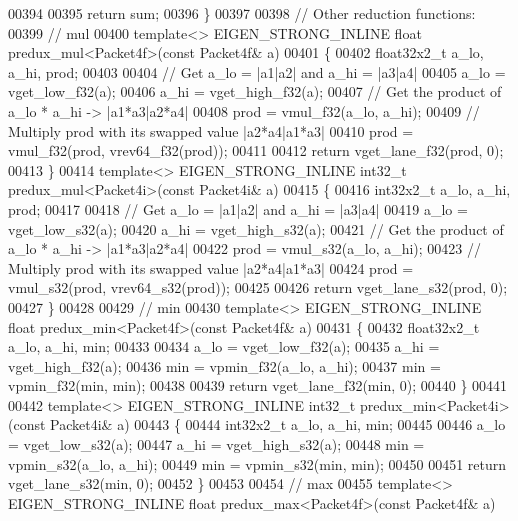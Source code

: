 \begin{DoxyCode}
{{00394 
00395   \textcolor{keywordflow}{return} sum;
00396 \}
00397 
00398 \textcolor{comment}{// Other reduction functions:}
00399 \textcolor{comment}{// mul}
00400 \textcolor{keyword}{template}<> EIGEN\_STRONG\_INLINE \textcolor{keywordtype}{float} predux\_mul<Packet4f>(\textcolor{keyword}{const} Packet4f& a)
00401 \{
00402   float32x2\_t a\_lo, a\_hi, prod;
00403 
00404   \textcolor{comment}{// Get a\_lo = |a1|a2| and a\_hi = |a3|a4|}
00405   a\_lo = vget\_low\_f32(a);
00406   a\_hi = vget\_high\_f32(a);
00407   \textcolor{comment}{// Get the product of a\_lo * a\_hi -> |a1*a3|a2*a4|}
00408   prod = vmul\_f32(a\_lo, a\_hi);
00409   \textcolor{comment}{// Multiply prod with its swapped value |a2*a4|a1*a3|}
00410   prod = vmul\_f32(prod, vrev64\_f32(prod));
00411 
00412   \textcolor{keywordflow}{return} vget\_lane\_f32(prod, 0);
00413 \}
00414 \textcolor{keyword}{template}<> EIGEN\_STRONG\_INLINE int32\_t predux\_mul<Packet4i>(\textcolor{keyword}{const} Packet4i& a)
00415 \{
00416   int32x2\_t a\_lo, a\_hi, prod;
00417 
00418   \textcolor{comment}{// Get a\_lo = |a1|a2| and a\_hi = |a3|a4|}
00419   a\_lo = vget\_low\_s32(a);
00420   a\_hi = vget\_high\_s32(a);
00421   \textcolor{comment}{// Get the product of a\_lo * a\_hi -> |a1*a3|a2*a4|}
00422   prod = vmul\_s32(a\_lo, a\_hi);
00423   \textcolor{comment}{// Multiply prod with its swapped value |a2*a4|a1*a3|}
00424   prod = vmul\_s32(prod, vrev64\_s32(prod));
00425 
00426   \textcolor{keywordflow}{return} vget\_lane\_s32(prod, 0);
00427 \}
00428 
00429 \textcolor{comment}{// min}
00430 \textcolor{keyword}{template}<> EIGEN\_STRONG\_INLINE \textcolor{keywordtype}{float} predux\_min<Packet4f>(\textcolor{keyword}{const} Packet4f& a)
00431 \{
00432   float32x2\_t a\_lo, a\_hi, min;
00433 
00434   a\_lo = vget\_low\_f32(a);
00435   a\_hi = vget\_high\_f32(a);
00436   min = vpmin\_f32(a\_lo, a\_hi);
00437   min = vpmin\_f32(min, min);
00438 
00439   \textcolor{keywordflow}{return} vget\_lane\_f32(min, 0);
00440 \}
00441 
00442 \textcolor{keyword}{template}<> EIGEN\_STRONG\_INLINE int32\_t predux\_min<Packet4i>(\textcolor{keyword}{const} Packet4i& a)
00443 \{
00444   int32x2\_t a\_lo, a\_hi, min;
00445 
00446   a\_lo = vget\_low\_s32(a);
00447   a\_hi = vget\_high\_s32(a);
00448   min = vpmin\_s32(a\_lo, a\_hi);
00449   min = vpmin\_s32(min, min);
00450   
00451   \textcolor{keywordflow}{return} vget\_lane\_s32(min, 0);
00452 \}
00453 
00454 \textcolor{comment}{// max}
00455 \textcolor{keyword}{template}<> EIGEN\_STRONG\_INLINE \textcolor{keywordtype}{float} predux\_max<Packet4f>(\textcolor{keyword}{const} Packet4f& a)
}}
\end{DoxyCode}
